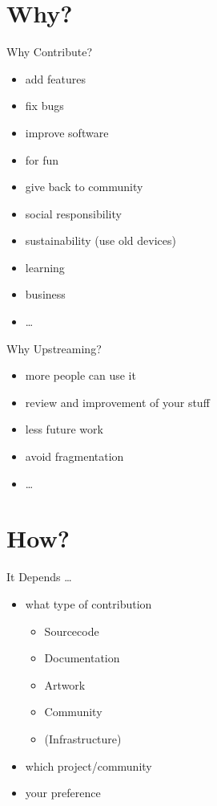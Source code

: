 \documentclass{beamer}
\begin{document}
\section{Why?}

\begin{frame}{Why Contribute?}
    \begin{itemize}
        \item add features
        \item fix bugs
        \item improve software
        \item for fun
        \item give back to community
        \item social responsibility
        \item sustainability (use old devices)
        \item learning
        \item business
        \item \dots
    \end{itemize}
\end{frame}

\begin{frame}{Why Upstreaming?}
    \begin{itemize}
        \item more people can use it
        \item review and improvement of your stuff
        \item less future work
        \item avoid fragmentation
        \item \dots
    \end{itemize}
\end{frame}

\section{How?}

\begin{frame}{It Depends \dots}
    \begin{itemize}
        \item what type of contribution
            \begin{itemize}
                \item Sourcecode
                \item Documentation
                \item Artwork
                \item Community
                \item (Infrastructure)
            \end{itemize}
        \item which project/community
        \item your preference
    \end{itemize}
\end{frame}
\end{document}
